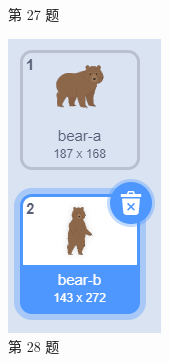 \documentclass[10pt, a4paper]{article}
\begin{document}
\begin{enumerate}
\begin{figure}[htbp]
\begin{minipage}[t]{.08\textwidth}
                \caption*{第 27 题}
            \end{minipage}
            \begin{minipage}[t]{.11\textwidth}
                \centering
                \includegraphics[width=\textwidth]{28.png}
                \caption*{第 28 题}
            \end{minipage}

\end{figure}
\end{enumerate}
\end{document}
